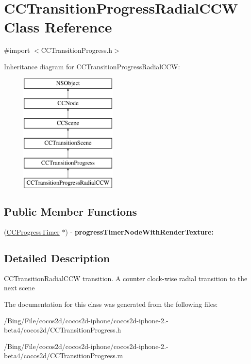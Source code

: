 \hypertarget{interface_c_c_transition_progress_radial_c_c_w}{\section{C\-C\-Transition\-Progress\-Radial\-C\-C\-W Class Reference}
\label{interface_c_c_transition_progress_radial_c_c_w}
}


{\ttfamily \#import $<$C\-C\-Transition\-Progress.\-h$>$}

Inheritance diagram for C\-C\-Transition\-Progress\-Radial\-C\-C\-W\-:\begin{figure}[H]
\begin{center}
\leavevmode
\includegraphics[height=6.000000cm]{interface_c_c_transition_progress_radial_c_c_w}
\end{center}
\end{figure}
\subsection*{Public Member Functions}
\begin{DoxyCompactItemize}
\item 
\hypertarget{interface_c_c_transition_progress_radial_c_c_w_a56ccdc154ea6cea2b1a376171c540432}{(\hyperlink{interface_c_c_progress_timer}{C\-C\-Progress\-Timer} $\ast$) -\/ {\bfseries progress\-Timer\-Node\-With\-Render\-Texture\-:}}\label{interface_c_c_transition_progress_radial_c_c_w_a56ccdc154ea6cea2b1a376171c540432}

\end{DoxyCompactItemize}


\subsection{Detailed Description}
C\-C\-Transition\-Radial\-C\-C\-W transition. A counter clock-\/wise radial transition to the next scene 

The documentation for this class was generated from the following files\-:\begin{DoxyCompactItemize}
\item 
/\-Bing/\-File/cocos2d/cocos2d-\/iphone/cocos2d-\/iphone-\/2.-\/beta4/cocos2d/C\-C\-Transition\-Progress.\-h\item 
/\-Bing/\-File/cocos2d/cocos2d-\/iphone/cocos2d-\/iphone-\/2.-\/beta4/cocos2d/C\-C\-Transition\-Progress.\-m\end{DoxyCompactItemize}
